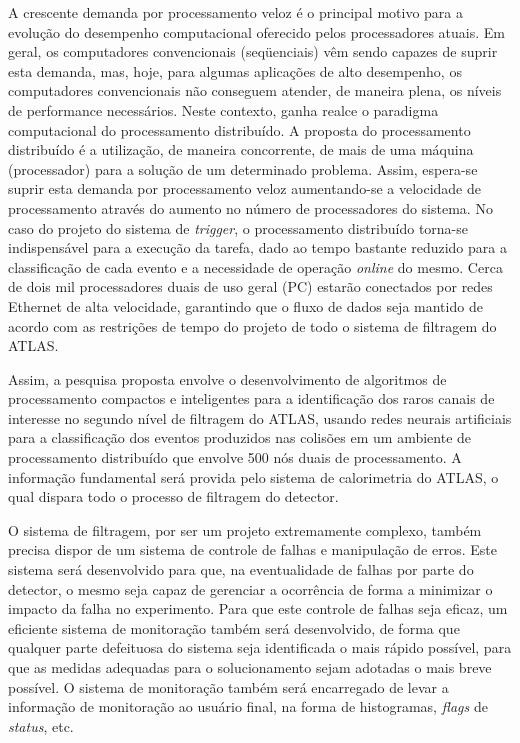 A crescente demanda por processamento veloz é o principal motivo para a evolução do desempenho computacional oferecido pelos processadores atuais. Em geral, os computadores convencionais (seqüenciais) vêm sendo capazes de suprir esta demanda, mas, hoje, para algumas aplicações de alto desempenho, os computadores convencionais não conseguem atender, de maneira plena, os níveis de performance necessários. Neste contexto, ganha realce o paradigma computacional do processamento distribuído. A proposta do processamento distribuído é a utilização, de maneira concorrente, de mais de uma máquina (processador) para a solução de um determinado problema. Assim, espera-se suprir esta demanda por processamento veloz aumentando-se a velocidade de processamento através do aumento no número de processadores do sistema. No caso do projeto do sistema de \emph{trigger}, o processamento distribuído torna-se indispensável para a execução da tarefa, dado ao tempo bastante reduzido para a classificação de cada evento e a necessidade de operação \emph{online} do mesmo. Cerca de dois mil processadores duais de uso geral (PC) estarão conectados por redes Ethernet de alta velocidade, garantindo que o fluxo de dados seja mantido de acordo com as restrições de tempo do projeto de todo o sistema de filtragem do ATLAS.

Assim, a pesquisa proposta envolve o desenvolvimento de algoritmos de processamento compactos e inteligentes para a identificação dos raros canais de interesse no segundo nível de filtragem do ATLAS, usando redes neurais artificiais para a classificação dos eventos produzidos nas colisões em um ambiente de processamento distribuído que envolve 500 nós duais de processamento. A informação fundamental será provida pelo sistema de calorimetria do ATLAS, o qual dispara todo o processo de filtragem do detector.

O sistema de filtragem, por ser um projeto extremamente complexo, também precisa dispor de um sistema de controle de falhas e manipulação de erros. Este sistema será desenvolvido para que, na eventualidade de falhas por parte do detector, o mesmo seja capaz de gerenciar a ocorrência de forma a minimizar o impacto da falha no experimento. Para que este controle de falhas seja eficaz, um eficiente sistema de monitoração também será desenvolvido, de forma que qualquer parte defeituosa do sistema seja identificada o mais rápido possível, para que as medidas adequadas para o solucionamento sejam adotadas o mais breve possível. O sistema de monitoração também será encarregado de levar a informação de monitoração ao usuário final, na forma de histogramas, \emph{flags} de \emph{status}, etc.

